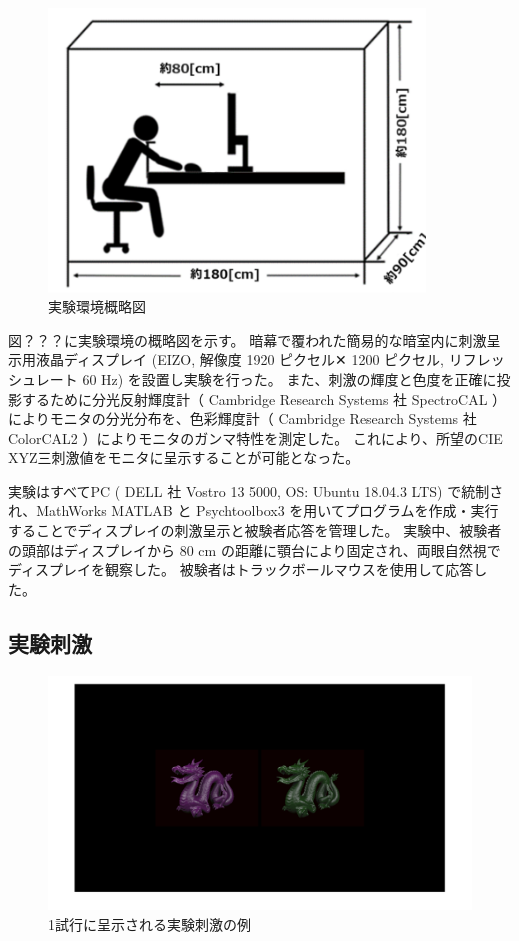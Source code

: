         \begin{figure}
            \centering
            \includegraphics[width=10.0cm]{./img/darkroom_p.png}
            \caption{実験環境概略図}
            \label{darkroom}
        \end{figure}

        図？？？に実験環境の概略図を示す。
        暗幕で覆われた簡易的な暗室内に刺激呈示用液晶ディスプレイ (EIZO, 解像度 1920 ピクセル✕ 1200 ピクセル, リフレッシュレート 60 Hz) を設置し実験を行った。
        また、刺激の輝度と色度を正確に投影するために分光反射輝度計（ Cambridge Research Systems 社 SpectroCAL ） によりモニタの分光分布を、色彩輝度計（ Cambridge Research Systems 社 ColorCAL2 ）によりモニタのガンマ特性を測定した。
        これにより、所望のCIE XYZ三刺激値をモニタに呈示することが可能となった。
        
        実験はすべてPC ( DELL 社 Vostro 13 5000, OS: Ubuntu 18.04.3 LTS) で統制され、MathWorks MATLAB と Psychtoolbox3 を用いてプログラムを作成・実行することでディスプレイの刺激呈示と被験者応答を管理した。
        実験中、被験者の頭部はディスプレイから 80 cm の距離に顎台により固定され、両眼自然視でディスプレイを観察した。
        被験者はトラックボールマウスを使用して応答した。

    \subsection{実験刺激}

        \begin{figure}
            \centering
            \includegraphics[width=14.0cm]{./img/ex1_stimuli.png}
            \caption{1試行に呈示される実験刺激の例}
            \label{darkroom}
        \end{figure}

